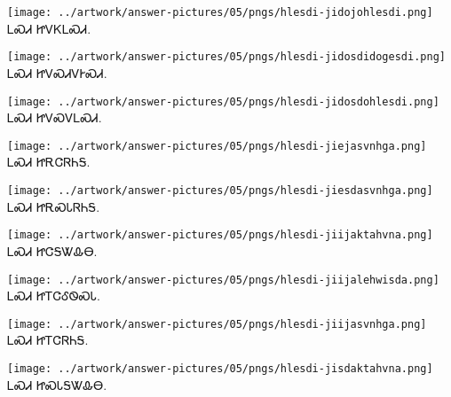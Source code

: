 \documentclass[avery5371,frame]{flashcards}%
\begin{document}
\begin{flashcard}{
\texttt{[image: ../artwork/answer-pictures/05/pngs/hlesdi-jidojohlesdi.png]}
}\Huge ᏞᏍᏗ ᏥᏙᏦᏞᏍᏗ.
\end{flashcard}

\begin{flashcard}{
\texttt{[image: ../artwork/answer-pictures/05/pngs/hlesdi-jidosdidogesdi.png]}
}\Huge ᏞᏍᏗ ᏥᏙᏍᏗᏙᎨᏍᏗ.
\end{flashcard}

\begin{flashcard}{
\texttt{[image: ../artwork/answer-pictures/05/pngs/hlesdi-jidosdohlesdi.png]}
}\Huge ᏞᏍᏗ ᏥᏙᏍᏙᏞᏍᏗ.
\end{flashcard}

\begin{flashcard}{
\texttt{[image: ../artwork/answer-pictures/05/pngs/hlesdi-jiejasvnhga.png]}
}\Huge ᏞᏍᏗ ᏥᎡᏣᏒᏂᎦ.
\end{flashcard}

\begin{flashcard}{
\texttt{[image: ../artwork/answer-pictures/05/pngs/hlesdi-jiesdasvnhga.png]}
}\Huge ᏞᏍᏗ ᏥᎡᏍᏓᏒᏂᎦ.
\end{flashcard}

\begin{flashcard}{
\texttt{[image: ../artwork/answer-pictures/05/pngs/hlesdi-jiijaktahvna.png]}
}\Huge ᏞᏍᏗ ᏥᏣᎦᏔᎲᎾ.
\end{flashcard}

\begin{flashcard}{
\texttt{[image: ../artwork/answer-pictures/05/pngs/hlesdi-jiijalehwisda.png]}
}\Huge ᏞᏍᏗ ᏥᎢᏣᎴᏫᏍᏓ.
\end{flashcard}

\begin{flashcard}{
\texttt{[image: ../artwork/answer-pictures/05/pngs/hlesdi-jiijasvnhga.png]}
}\Huge ᏞᏍᏗ ᏥᎢᏣᏒᏂᎦ.
\end{flashcard}

\begin{flashcard}{
\texttt{[image: ../artwork/answer-pictures/05/pngs/hlesdi-jisdaktahvna.png]}
}\Huge ᏞᏍᏗ ᏥᏍᏓᎦᏔᎲᎾ.
\end{flashcard}
\end{document}

